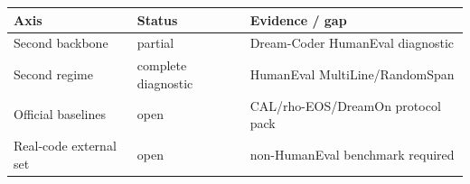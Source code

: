 \begin{tabular}{lll}
\toprule
Axis & Status & Evidence / gap \\
\midrule
Second backbone & partial & Dream-Coder HumanEval diagnostic \\
Second regime & complete diagnostic & HumanEval MultiLine/RandomSpan \\
Official baselines & open & CAL/rho-EOS/DreamOn protocol pack \\
Real-code external set & open & non-HumanEval benchmark required \\
\bottomrule
\end{tabular}
